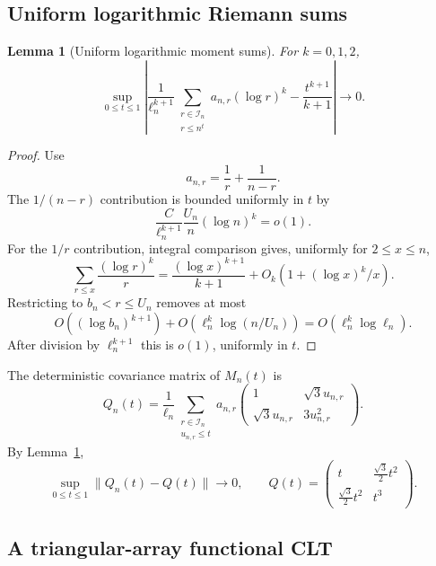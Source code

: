 \documentclass[11pt]{article}
\newtheorem{lemma}[theorem]{Lemma}
\theoremstyle{definition}
\theoremstyle{remark}
\newcommand{\cI}{\mathcal I}
\begin{document}
\subsection{Uniform logarithmic Riemann sums}

\begin{lemma}[Uniform logarithmic moment sums]
\label{lem:Riemann}
For $k=0,1,2$,
\begin{equation}\label{eq:Riemann}
 \sup_{0\le t\le1}
 \left|
 \frac1{\ell_n^{k+1}}
 \sum_{\substack{r\in\cI_n\\r\le n^t}}
 a_{n,r}(\log r)^k
 -\frac{t^{k+1}}{k+1}
 \right|
 \longrightarrow0.
\end{equation}
\end{lemma}

\begin{proof}
Use
\[
 a_{n,r}=\frac1r+\frac1{n-r}.
\]
The $1/(n-r)$ contribution is bounded uniformly in $t$ by
\[
 \frac{C}{\ell_n^{k+1}}
 \frac{U_n}{n}(\log n)^k=o(1).
\]
For the $1/r$ contribution, integral comparison gives, uniformly for
$2\le x\le n$,
\[
 \sum_{r\le x}\frac{(\log r)^k}{r}
 =\frac{(\log x)^{k+1}}{k+1}+O_k(1+(\log x)^k/x).
\]
Restricting to $b_n<r\le U_n$ removes at most
\[
 O((\log b_n)^{k+1})+O(\ell_n^k\log(n/U_n))
 =O(\ell_n^k\log\ell_n).
\]
After division by $\ell_n^{k+1}$ this is $o(1)$, uniformly in $t$.
\end{proof}

The deterministic covariance matrix of $M_n(t)$ is
\begin{equation}\label{eq:Qn}
 Q_n(t)=\frac1{\ell_n}
 \sum_{\substack{r\in\cI_n\\u_{n,r}\le t}}
 a_{n,r}
 \begin{pmatrix}
 1&\sqrt3u_{n,r}\\
 \sqrt3u_{n,r}&3u_{n,r}^2
 \end{pmatrix}.
\end{equation}
By Lemma~\ref{lem:Riemann},
\begin{equation}\label{eq:Q-limit}
 \sup_{0\le t\le1}\|Q_n(t)-Q(t)\|\longrightarrow0,
 \qquad
 Q(t)=
 \begin{pmatrix}
 t&\frac{\sqrt3}{2}t^2\\[1mm]
 \frac{\sqrt3}{2}t^2&t^3
 \end{pmatrix}.
\end{equation}

\subsection{A triangular-array functional CLT}
\end{document}

